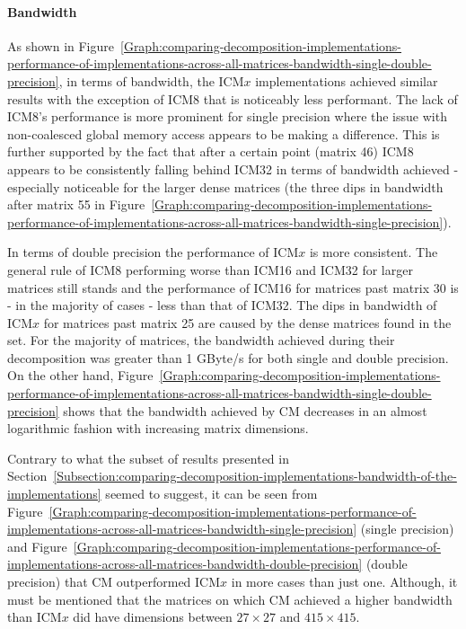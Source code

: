\paragraph{Bandwidth} As shown in Figure~\ref{Graph:comparing-decomposition-implementations-performance-of-implementations-across-all-matrices-bandwidth-single-double-precision}, in terms of bandwidth, the ICM$ x $ implementations achieved similar results with the exception of ICM8 that is noticeably less performant. The lack of ICM8's performance is more prominent for single precision where the issue with non-coalesced global memory access appears to be making a difference. This is further supported by the fact that after a certain point (matrix 46) ICM8 appears to be consistently falling behind ICM32 in terms of bandwidth achieved - especially noticeable for the larger dense matrices (the three dips in bandwidth after matrix 55 in Figure~\ref{Graph:comparing-decomposition-implementations-performance-of-implementations-across-all-matrices-bandwidth-single-precision}).
\par In terms of double precision the performance of ICM$ x $ is more consistent. The general rule of ICM8 performing worse than ICM16 and ICM32 for larger matrices still stands and the performance of ICM16 for matrices past matrix 30 is - in the majority of cases - less than that of ICM32. The dips in bandwidth of ICM$ x $ for matrices past matrix 25 are caused by the dense matrices found in the set. For the majority of matrices, the bandwidth achieved during their decomposition was greater than 1 GByte/s for both single and double precision. On the other hand, Figure~\ref{Graph:comparing-decomposition-implementations-performance-of-implementations-across-all-matrices-bandwidth-single-double-precision} shows that the bandwidth achieved by CM decreases in an almost logarithmic fashion with increasing matrix dimensions.
\par Contrary to what the subset of results presented in Section~\ref{Subsection:comparing-decomposition-implementations-bandwidth-of-the-implementations} seemed to suggest, it can be seen from Figure~\ref{Graph:comparing-decomposition-implementations-performance-of-implementations-across-all-matrices-bandwidth-single-precision} (single precision) and Figure~\ref{Graph:comparing-decomposition-implementations-performance-of-implementations-across-all-matrices-bandwidth-double-precision} (double precision) that CM outperformed ICM$ x $ in more cases than just one. Although, it must be mentioned that the matrices on which CM achieved a higher bandwidth than ICM$ x $ did have dimensions between $ 27\times 27 $ and $ 415\times 415 $.

